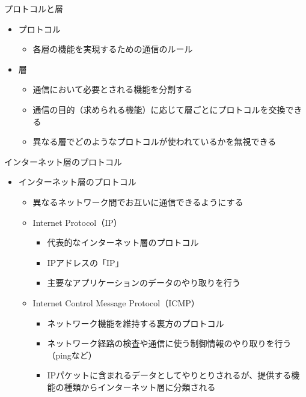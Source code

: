 \documentclass[12pt,aspectratio=169]{beamer}
\begin{document}
\begin{frame}{プロトコルと層}

  \begin{itemize}
    \item プロトコル
      \begin{itemize}
        \item 各層の機能を実現するための通信のルール

      \end{itemize}

    \item 層
      \begin{itemize}
        \item 通信において必要とされる機能を分割する
        \item 通信の目的（求められる機能）に応じて層ごとにプロトコルを交換できる
        \item 異なる層でどのようなプロトコルが使われているかを無視できる

      \end{itemize}


  \end{itemize}

\end{frame}


\begin{frame}{インターネット層のプロトコル}

  \begin{itemize}
    \item インターネット層のプロトコル
      \begin{itemize}
        \item 異なるネットワーク間でお互いに通信できるようにする
        \item Internet Protocol（IP）
          \begin{itemize}
            \item 代表的なインターネット層のプロトコル
            \item IPアドレスの「IP」
            \item 主要なアプリケーションのデータのやり取りを行う
          \end{itemize}

        \item Internet Control Message Protocol（ICMP）
          \begin{itemize}
            \item ネットワーク機能を維持する裏方のプロトコル
            \item ネットワーク経路の検査や通信に使う制御情報のやり取りを行う（pingなど）
            \item IPパケットに含まれるデータとしてやりとりされるが、提供する機能の種類からインターネット層に分類される
          \end{itemize}

      \end{itemize}
  \end{itemize}

\end{frame}
\end{document}
